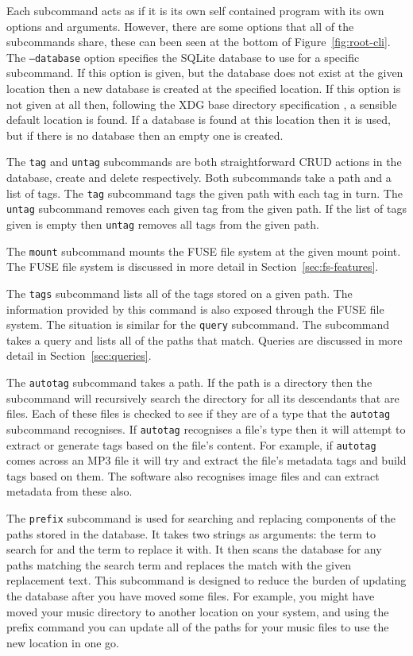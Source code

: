 Each subcommand acts as if it is its own self contained program with its own
options and arguments. However, there are some options that all of the
subcommands share, these can been seen at the bottom of
Figure~\ref{fig:root-cli}. The \texttt{--database} option specifies the SQLite
database to use for a specific subcommand. If this option is given, but the
database does not exist at the given location then a new database is created at
the specified location. If this option is not given at all then, following the
XDG base directory specification \cite{xdg-base-dir-spec}, a sensible default
location is found. If a database is found at this location then it is used, but
if there is no database then an empty one is created.

The \texttt{tag} and \texttt{untag} subcommands are both straightforward CRUD
actions in the database, create and delete respectively. Both subcommands take
a path and a list of tags. The \texttt{tag} subcommand tags the given path with
each tag in turn. The \texttt{untag} subcommand removes each given tag from the
given path. If the list of tags given is empty then \texttt{untag} removes all
tags from the given path.

The \texttt{mount} subcommand mounts the FUSE file system at the given mount
point. The FUSE file system is discussed in more detail in
Section~\ref{sec:fs-features}.

The \texttt{tags} subcommand lists all of the tags stored on a given path. The
information provided by this command is also exposed through the FUSE file
system. The situation is similar for the \texttt{query} subcommand. The
subcommand takes a query and lists all of the paths that match. Queries are
discussed in more detail in Section~\ref{sec:queries}.

The \texttt{autotag} subcommand takes a path. If the path is a directory then
the subcommand will recursively search the directory for all its descendants
that are files. Each of these files is checked to see if they are of a type
that the \texttt{autotag} subcommand recognises. If \texttt{autotag} recognises
a file's type then it will attempt to extract or generate tags based on the
file's content. For example, if \texttt{autotag} comes across an MP3 file it
will try and extract the file's metadata tags and build tags based on them.
 The software also recognises image files and can extract
metadata from these also. 

The \texttt{prefix} subcommand is used for searching and replacing components
of the paths stored in the database. It takes two strings as arguments: the
term to search for and the term to replace it with. It then scans the database
for any paths matching the search term and replaces the match with the given
replacement text. This subcommand is designed to reduce the burden of updating
the database after you have moved some files. For example, you might have moved
your music directory to another location on your system, and using the prefix
command you can update all of the paths for your music files to use the new
location in one go.

